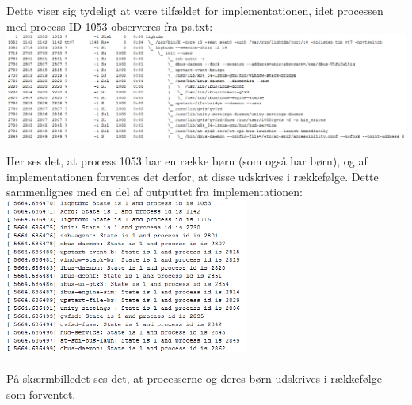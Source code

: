 Dette viser sig tydeligt at være tilfældet for implementationen, idet processen med process-ID 1053 observeres fra ps.txt:\\
\includegraphics[width=\textwidth]{Testing/DFS1.png}

Her ses det, at process 1053 har en række børn (som også har børn), og af implementationen forventes det derfor, at disse udskrives i rækkefølge. Dette sammenlignes med en del af outputtet fra implementationen:\\
\includegraphics[width=0.6\textwidth]{Testing/DFS2.png}\\
\\
På skærmbilledet ses det, at processerne og deres børn udskrives i rækkefølge - som forventet.